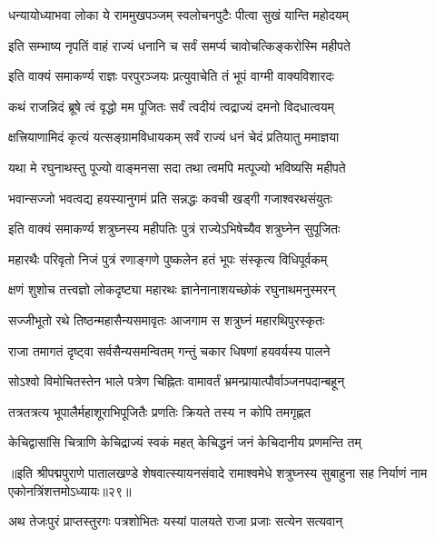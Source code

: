\twolineshloka
{धन्यायोध्याभवा लोका ये राममुखपञ्जम्}
{स्वलोचनपुटैः पीत्वा सुखं यान्ति महोदयम्}%

\twolineshloka
{इति सम्भाष्य नृपतिं वाहं राज्यं धनानि च}
{सर्वं समर्प्य चावोचत्किङ्करोस्मि महीपते}%

\twolineshloka
{इति वाक्यं समाकर्ण्य राज्ञः परपुरञ्जयः}
{प्रत्युवाचेति तं भूपं वाग्मी वाक्यविशारदः}%


\twolineshloka
{कथं राजन्निदं ब्रूषे त्वं वृद्धो मम पूजितः}
{सर्वं त्वदीयं त्वद्राज्यं दमनो विदधात्वयम्}%

\twolineshloka
{क्षत्त्रियाणामिदं कृत्यं यत्सङ्ग्रामविधायकम्}
{सर्वं राज्यं धनं चेदं प्रतियातु ममाज्ञया}%

\twolineshloka
{यथा मे रघुनाथस्तु पूज्यो वाङ्मनसा सदा}
{तथा त्वमपि मत्पूज्यो भविष्यसि महीपते}%

\twolineshloka
{भवान्सज्जो भवत्वद्य हयस्यानुगमं प्रति}
{सन्नद्धः कवची खड्गी गजाश्वरथसंयुतः}%

\twolineshloka
{इति वाक्यं समाकर्ण्य शत्रुघ्नस्य महीपतिः}
{पुत्रं राज्येऽभिषेच्यैव शत्रुघ्नेन सुपूजितः}%

\twolineshloka
{महारथैः परिवृतो निजं पुत्रं रणाङ्गणे}
{पुष्कलेन हतं भूपः संस्कृत्य विधिपूर्वकम्}%

\twolineshloka
{क्षणं शुशोच तत्त्वज्ञो लोकदृष्ट्या महारथः}
{ज्ञानेनानाशयच्छोकं रघुनाथमनुस्मरन्}%

\twolineshloka
{सज्जीभूतो रथे तिष्ठन्महासैन्यसमावृतः}
{आजगाम स शत्रुघ्नं महारथिपुरस्कृतः}%

\twolineshloka
{राजा तमागतं दृष्ट्वा सर्वसैन्यसमन्वितम्}
{गन्तुं चकार धिषणां हयवर्यस्य पालने}%

\twolineshloka
{सोऽश्वो विमोचितस्तेन भाले पत्रेण चिह्नितः}
{वामावर्तं भ्रमन्प्रायात्पौर्वाञ्जनपदान्बहून्}%

\twolineshloka
{तत्रतत्रत्य भूपालैर्महाशूराभिपूजितैः}
{प्रणतिः क्रियते तस्य न कोपि तमगृह्णत}%

\twolineshloka
{केचिद्वासांसि चित्राणि केचिद्राज्यं स्वकं महत्}
{केचिद्धनं जनं केचिदानीय प्रणमन्ति तम्}%

॥इति श्रीपद्मपुराणे पातालखण्डे शेषवात्स्यायनसंवादे रामाश्वमेधे शत्रुघ्नस्य सुबाहुना सह निर्याणं नाम एकोनत्रिंशत्तमोऽध्यायः॥२९॥



\twolineshloka
{अथ तेजःपुरं प्राप्तस्तुरगः पत्रशोभितः}
{यस्यां पालयते राजा प्रजाः सत्येन सत्यवान्}%

